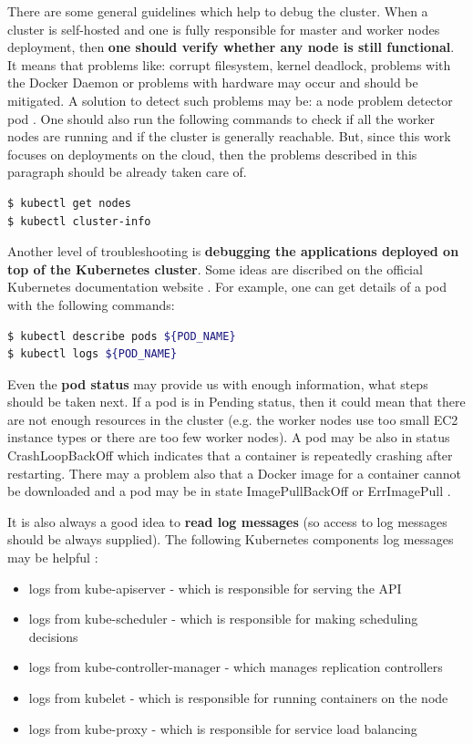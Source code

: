 There are some general guidelines which help to debug the cluster. When a cluster is self-hosted and one is fully responsible for master and worker nodes deployment, then \textbf{one should verify whether any node is still functional}. It means that problems like: corrupt filesystem, kernel deadlock, problems with the Docker Daemon or problems with hardware may occur and should be mitigated. A solution to detect such problems may be: a node problem detector pod \cite{book-mastering-k8s}. One should also run the following commands to check if all the worker nodes are running and if the cluster is generally reachable. But, since this work focuses on deployments on the cloud, then the problems described in this paragraph should be already taken care of.
\begin{lstlisting}[basicstyle=\tiny,caption={Getting information about a cluster},captionpos=b,language=Bash,xleftmargin=1cm]
$ kubectl get nodes
$ kubectl cluster-info
\end{lstlisting}

Another level of troubleshooting is \textbf{debugging the applications deployed on top of the Kubernetes cluster}. Some ideas are discribed on the official Kubernetes documentation website \cite{k8s-deb}. For example, one can get details of a pod with the following commands:
\begin{lstlisting}[basicstyle=\tiny,caption={Getting information about pods},captionpos=b,language=Bash,xleftmargin=1cm]
$ kubectl describe pods ${POD_NAME}
$ kubectl logs ${POD_NAME}
\end{lstlisting}

Even the \textbf{pod status} may provide us with enough information, what steps should be taken next. If a pod is in Pending status, then it could mean that there are not enough resources in the cluster (e.g. the worker nodes use too small EC2 instance types or there are too few worker nodes). A pod may be also in status CrashLoopBackOff which indicates that a container is repeatedly crashing after restarting. There may a problem also that a Docker image for a container cannot be downloaded and a pod may be in state ImagePullBackOff or ErrImagePull \cite{k8s-google-tr}.

It is also always a good idea to \textbf{read log messages} (so access to log messages should be always supplied). The following Kubernetes components log messages may be helpful \cite{k8s-deb-cluster}:
\begin{itemize}
\item logs from kube-apiserver - which is responsible for serving the API
\item logs from kube-scheduler - which is responsible for making scheduling decisions
\item logs from kube-controller-manager - which manages replication controllers
\item logs from kubelet - which is responsible for running containers on the node
\item logs from kube-proxy - which is responsible for service load balancing
\end{itemize}

